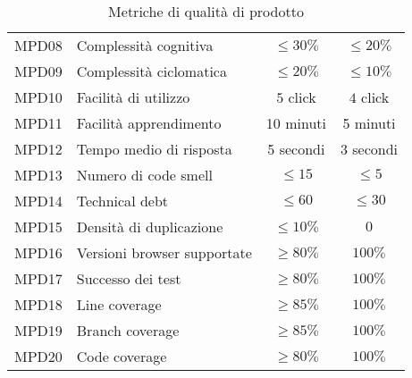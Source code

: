 \begin{table}[H]
\begin{tabular}{c|p{6cm}|c|c}
    MPD08 & Complessità cognitiva                                         & $\le30\%$                     & $\le20\%$                     \\
    MPD09 & Complessità ciclomatica                                       & $\le20\%$                     & $\le10\%$                     \\
    MPD10 & Facilità di utilizzo                                          & $5$ click                     & $4$ click                     \\
    MPD11 & Facilità apprendimento                                        & 10 minuti                     & 5 minuti                      \\
    MPD12 & Tempo medio di risposta                                       & 5 secondi                     & 3 secondi                     \\
    MPD13 & Numero di code smell                                          & $\le 15$                      & $\le 5$                       \\
    MPD14 & Technical debt                                                & $\le 60$                      & $\le 30$                      \\
    MPD15 & Densità di duplicazione                                       & $\le 10\%$                    & $0$                           \\
    MPD16 & Versioni browser supportate                                   & $\ge 80\%$                    & $100\%$                       \\
    MPD17 & Successo dei test                                             & $\ge 80\%$                    & $100\%$                       \\
    MPD18 & Line coverage                                                 & $\ge 85\%$                    & $100\%$                       \\
    MPD19 & Branch coverage                                               & $\ge 85\%$                    & $100\%$                       \\
    MPD20 & Code coverage                                                 & $\ge 80\%$                    & $100\%$                       \\
  \end{tabular}
  \caption{Metriche di qualità di prodotto}
\end{table}


